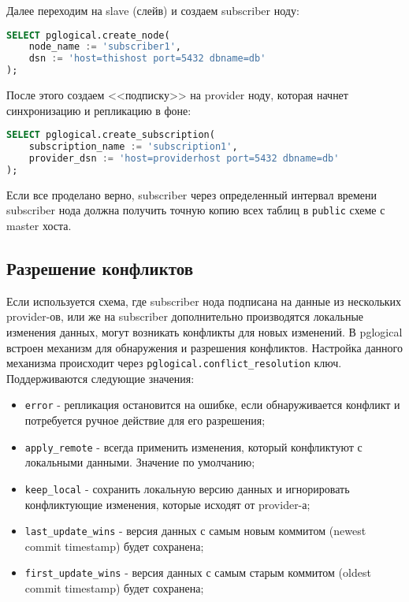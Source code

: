 Далее переходим на slave (слейв) и создаем subscriber ноду:

\begin{lstlisting}[label=lst:pglogical6,language=SQL,caption=Создаем subscriber]
SELECT pglogical.create_node(
    node_name := 'subscriber1',
    dsn := 'host=thishost port=5432 dbname=db'
);
\end{lstlisting}

После этого создаем <<подписку>> на provider ноду, которая начнет синхронизацию и репликацию в фоне:

\begin{lstlisting}[label=lst:pglogical7,language=SQL,caption=Активируем subscriber]
SELECT pglogical.create_subscription(
    subscription_name := 'subscription1',
    provider_dsn := 'host=providerhost port=5432 dbname=db'
);
\end{lstlisting}

Если все проделано верно, subscriber через определенный интервал времени subscriber нода должна получить точную копию всех таблиц в \lstinline!public! схеме с master хоста.


\subsection{Разрешение конфликтов}


Если используется схема, где subscriber нода подписана на данные из нескольких provider-ов, или же на subscriber дополнительно производятся локальные изменения данных, могут возникать конфликты для новых изменений. В pglogical встроен механизм для обнаружения и разрешения конфликтов. Настройка данного механизма происходит через  \lstinline!pglogical.conflict_resolution! ключ. Поддерживаются следующие значения:

\begin{itemize}
  \item \lstinline!error! - репликация остановится на ошибке, если обнаруживается конфликт и потребуется ручное действие для его разрешения;
  \item \lstinline!apply_remote! - всегда применить изменения, который конфликтуют с локальными данными. Значение по умолчанию;
  \item \lstinline!keep_local! - сохранить локальную версию данных и игнорировать конфликтующие изменения, которые исходят от provider-а;
  \item \lstinline!last_update_wins! - версия данных с самым новым коммитом (newest commit timestamp) будет сохранена;
  \item \lstinline!first_update_wins! - версия данных с самым старым коммитом (oldest commit timestamp) будет сохранена;
\end{itemize}

